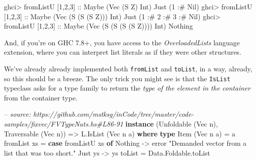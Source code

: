 \documentclass[]{article}
\newenvironment{Shaded}{}{}
\newcommand{\KeywordTok}[1]{\textcolor[rgb]{0.00,0.44,0.13}{\textbf{{#1}}}}
\newcommand{\DataTypeTok}[1]{\textcolor[rgb]{0.56,0.13,0.00}{{#1}}}
\newcommand{\DecValTok}[1]{\textcolor[rgb]{0.25,0.63,0.44}{{#1}}}
\newcommand{\StringTok}[1]{\textcolor[rgb]{0.25,0.44,0.63}{{#1}}}
\newcommand{\CommentTok}[1]{\textcolor[rgb]{0.38,0.63,0.69}{\textit{{#1}}}}
\newcommand{\OtherTok}[1]{\textcolor[rgb]{0.00,0.44,0.13}{{#1}}}
\newcommand{\FunctionTok}[1]{\textcolor[rgb]{0.02,0.16,0.49}{{#1}}}
\newcommand{\NormalTok}[1]{{#1}}
\begin{document}
\begin{Shaded}
\begin{Highlighting}[]
\NormalTok{ghci}\FunctionTok{>} \NormalTok{fromListU [}\DecValTok{1}\NormalTok{,}\DecValTok{2}\NormalTok{,}\DecValTok{3}\NormalTok{]}\OtherTok{ ::} \DataTypeTok{Maybe} \NormalTok{(}\DataTypeTok{Vec} \NormalTok{(}\DataTypeTok{S} \DataTypeTok{Z}\NormalTok{) }\DataTypeTok{Int}\NormalTok{)}
\DataTypeTok{Just} \NormalTok{(}\DecValTok{1} \FunctionTok{:#} \DataTypeTok{Nil}\NormalTok{)}
\NormalTok{ghci}\FunctionTok{>} \NormalTok{fromListU [}\DecValTok{1}\NormalTok{,}\DecValTok{2}\NormalTok{,}\DecValTok{3}\NormalTok{]}\OtherTok{ ::} \DataTypeTok{Maybe} \NormalTok{(}\DataTypeTok{Vec} \NormalTok{(}\DataTypeTok{S} \NormalTok{(}\DataTypeTok{S} \NormalTok{(}\DataTypeTok{S} \DataTypeTok{Z}\NormalTok{))) }\DataTypeTok{Int}\NormalTok{)}
\DataTypeTok{Just} \NormalTok{(}\DecValTok{1} \FunctionTok{:#} \DecValTok{2} \FunctionTok{:#} \DecValTok{3} \FunctionTok{:#} \DataTypeTok{Nil}\NormalTok{)}
\NormalTok{ghci}\FunctionTok{>} \NormalTok{fromListU [}\DecValTok{1}\NormalTok{,}\DecValTok{2}\NormalTok{,}\DecValTok{3}\NormalTok{]}\OtherTok{ ::} \DataTypeTok{Maybe} \NormalTok{(}\DataTypeTok{Vec} \NormalTok{(}\DataTypeTok{S} \NormalTok{(}\DataTypeTok{S} \NormalTok{(}\DataTypeTok{S} \NormalTok{(}\DataTypeTok{S} \DataTypeTok{Z}\NormalTok{)))) }\DataTypeTok{Int}\NormalTok{)}
\DataTypeTok{Nothing}
\end{Highlighting}
\end{Shaded}

And, if you're on GHC 7.8+, you have access to the \emph{OverloadedLists}
language extension, where you can interpret list literals as if they were other
structures.

We've already already implemented both \texttt{fromList} and \texttt{toList}, in
a way, already, so this should be a breeze. The only trick you might see is that
the \texttt{IsList} typeclass asks for a type family to return the \emph{type of
the element in the container} from the container type.

\begin{Shaded}
\begin{Highlighting}[]
\CommentTok{-- source: https://github.com/mstksg/inCode/tree/master/code-samples/fixvec/FVTypeNats.hs#L86-91}
\KeywordTok{instance} \NormalTok{(}\DataTypeTok{Unfoldable} \NormalTok{(}\DataTypeTok{Vec} \NormalTok{n), }\DataTypeTok{Traversable} \NormalTok{(}\DataTypeTok{Vec} \NormalTok{n)) }\OtherTok{=>} \DataTypeTok{L.IsList} \NormalTok{(}\DataTypeTok{Vec} \NormalTok{n a) }\KeywordTok{where}
    \KeywordTok{type} \DataTypeTok{Item} \NormalTok{(}\DataTypeTok{Vec} \NormalTok{n a) }\FunctionTok{=} \NormalTok{a}
    \NormalTok{fromList xs }\FunctionTok{=} \KeywordTok{case} \NormalTok{fromListU xs }\KeywordTok{of}
                    \DataTypeTok{Nothing} \OtherTok{->} \NormalTok{error }\StringTok{"Demanded vector from a list that was too short."}
                    \DataTypeTok{Just} \NormalTok{ys }\OtherTok{->} \NormalTok{ys}
    \NormalTok{toList      }\FunctionTok{=} \NormalTok{Data.Foldable.toList}
\end{Highlighting}
\end{Shaded}
\end{document}
